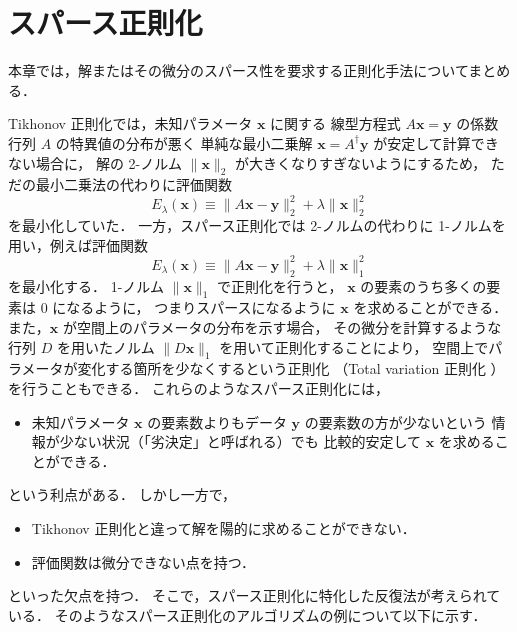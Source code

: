 %

\chapter{スパース正則化}\label{chap:regularization_sparse}

本章では，解またはその微分のスパース性を要求する正則化手法についてまとめる．

Tikhonov 正則化では，未知パラメータ $\bm{x}$ に関する
線型方程式 $A \bm{x} = \bm{y}$ の係数行列 $A$ の特異値の分布が悪く
単純な最小二乗解 $\bm{x} = A^\dagger \bm{y}$ が安定して計算できない場合に，
解の 2-ノルム $\|\bm{x}\|_2$ が大きくなりすぎないようにするため，
ただの最小二乗法の代わりに評価関数
\begin{equation}
    E_{\lambda}(\bm{x}) \equiv \|A \bm{x} - \bm{y}\|_2^2 + \lambda \|\bm{x}\|_2^2
\end{equation}
を最小化していた．
一方，スパース正則化では 2-ノルムの代わりに 1-ノルムを用い，例えば評価関数
\begin{equation}
    E_{\lambda}(\bm{x}) \equiv \|A \bm{x} - \bm{y}\|_2^2 + \lambda \|\bm{x}\|_1^2
    \label{eq:regularization_sparse_l1_objective}
\end{equation}
を最小化する．
1-ノルム $\|\bm{x}\|_1$ で正則化を行うと，
$\bm{x}$ の要素のうち多くの要素は 0 になるように，
つまりスパースになるように $\bm{x}$ を求めることができる．
また，$\bm{x}$ が空間上のパラメータの分布を示す場合，
その微分を計算するような行列 $D$ を用いたノルム $\|D \bm{x}\|_1$ を用いて正則化することにより，
空間上でパラメータが変化する箇所を少なくするという正則化
（Total variation 正則化
）
を行うこともできる．
これらのようなスパース正則化には，
\begin{itemize}
    \item 未知パラメータ $\bm{x}$ の要素数よりもデータ $\bm{y}$ の要素数の方が少ないという
          情報が少ない状況（「劣決定」と呼ばれる）でも
          比較的安定して $\bm{x}$ を求めることができる．
\end{itemize}
という利点がある．
しかし一方で，
\begin{itemize}
    \item Tikhonov 正則化と違って解を陽的に求めることができない．
    \item 評価関数は微分できない点を持つ．
\end{itemize}
といった欠点を持つ．
そこで，スパース正則化に特化した反復法が考えられている．
そのようなスパース正則化のアルゴリズムの例について以下に示す．
